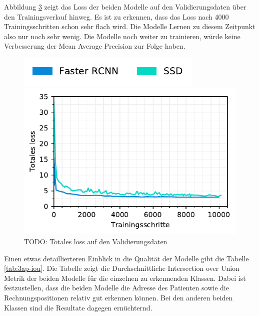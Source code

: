 \begin{figure}[H]
\begin{subfigure}[t]{0.5\linewidth}
    \label{fig:3ap-map:map_val}
    \vspace{2ex}
  \end{subfigure}
\end{figure}


Abbildung \ref{fig:3ap-map:loss} zeigt das Loss der beiden Modelle auf den Validierungsdaten über den Trainingsverlauf hinweg. Es ist zu erkennen, dass das Loss nach 4000 Trainingsschritten schon sehr flach wird. Die Modelle Lernen zu diesem Zeitpunkt also nur noch sehr wenig. Die Modelle noch weiter zu trainieren, würde keine Verbesserung der Mean Average Precision zur Folge haben.

\begin{figure}[h!] 
    \captionsetup{width=.9\linewidth}
    \caption{TODO: Totales loss auf den Validierungsdaten}
    \label{fig:3ap-map:loss}
    \centering
    \includegraphics[scale=1]{graphics/matplot/img-detection__legend_1.pdf}
    
    \includegraphics[scale=1]{graphics/matplot/img-detection__all__loss.pdf}
\end{figure}

Einen etwas detaillierteren Einblick in die Qualität der Modelle gibt die Tabelle \ref{tab:3ap-iou}. Die Tabelle zeigt die Durchschnittliche Intersection over Union Metrik der beiden Modelle für die einzelnen zu erkennenden Klassen. Dabei ist festzustellen, dass die beiden Modelle die Adresse des Patienten sowie die Rechnungspositionen relativ gut erkennen können. Bei den anderen beiden Klassen sind die Resultate dagegen ernüchternd.

